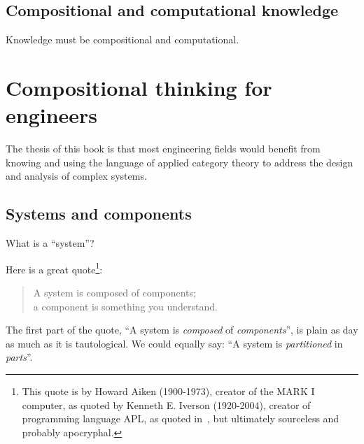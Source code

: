 %
%

\subsection{Compositional and computational knowledge}

Knowledge must be compositional and computational.


\section{Compositional thinking for engineers }
\label{sec:introduction-thesis}

The thesis of this book is that most engineering fields would benefit from knowing and using the language of applied category theory to address the design and analysis of complex systems.

\subsection{Systems and components}

\label{sec:introduction-systems-and-components}

What is a ``system''?

Here is a great quote\footnote{
  This quote is by Howard Aiken (1900-1973), creator of the MARK I computer,
  as quoted by Kenneth E. Iverson (1920-2004), creator of programming language APL,
  as quoted in~\cite{McIntyre1999Role}, but ultimately sourceless and probably apocryphal.
}:

\begin{quote}
  A system is composed of components;  \\
  a component is something you understand.
\end{quote}

The first part of the quote, ``A system is \emph{composed} of \emph{components}'', is plain as day as much as it is tautological. We could equally say: ``A system is \emph{partitioned} in \emph{parts}''.

